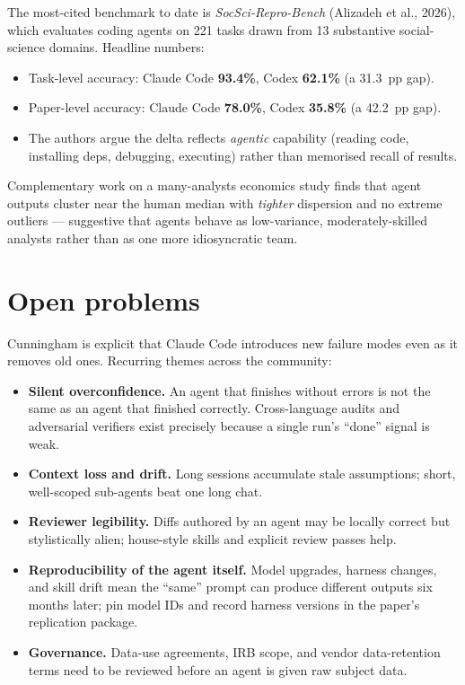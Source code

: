 \documentclass[11pt,a4paper]{article}
\begin{document}
The most-cited benchmark to date is \emph{SocSci-Repro-Bench}
(Alizadeh et al., 2026), which evaluates coding agents on 221 tasks
drawn from 13 substantive social-science domains. Headline numbers:

\begin{itemize}[leftmargin=1.2em]
  \item Task-level accuracy: Claude Code \textbf{93.4\%}, Codex
        \textbf{62.1\%} (a 31.3~pp gap).
  \item Paper-level accuracy: Claude Code \textbf{78.0\%}, Codex
        \textbf{35.8\%} (a 42.2~pp gap).
  \item The authors argue the delta reflects \emph{agentic}
        capability (reading code, installing deps, debugging,
        executing) rather than memorised recall of results.
\end{itemize}

Complementary work on a many-analysts economics study finds that
agent outputs cluster near the human median with \emph{tighter}
dispersion and no extreme outliers --- suggestive that agents behave
as low-variance, moderately-skilled analysts rather than as one more
idiosyncratic team.

\section{Open problems}

Cunningham is explicit that Claude Code introduces new failure modes
even as it removes old ones. Recurring themes across the community:

\begin{itemize}[leftmargin=1.2em]
  \item \textbf{Silent overconfidence.} An agent that finishes
        without errors is not the same as an agent that finished
        correctly. Cross-language audits and adversarial verifiers
        exist precisely because a single run's ``done'' signal is
        weak.
  \item \textbf{Context loss and drift.} Long sessions accumulate
        stale assumptions; short, well-scoped sub-agents beat one
        long chat.
  \item \textbf{Reviewer legibility.} Diffs authored by an agent
        may be locally correct but stylistically alien; house-style
        skills and explicit review passes help.
  \item \textbf{Reproducibility of the agent itself.} Model
        upgrades, harness changes, and skill drift mean the ``same''
        prompt can produce different outputs six months later; pin
        model IDs and record harness versions in the paper's
        replication package.
  \item \textbf{Governance.} Data-use agreements, IRB scope, and
        vendor data-retention terms need to be reviewed before an
        agent is given raw subject data.
\end{itemize}
\end{document}

